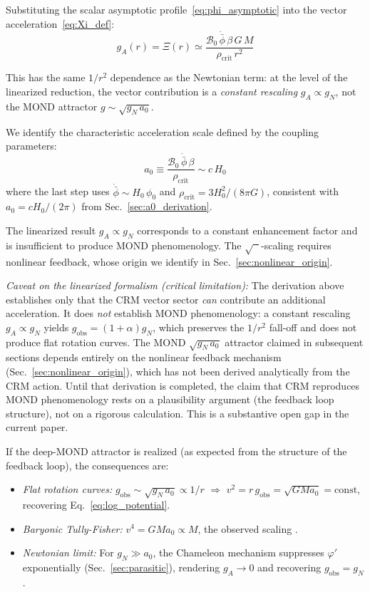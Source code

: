 \documentclass[aps,prd,twocolumn,superscriptaddress,nofootinbib]{revtex4-2}
\begin{document}
Substituting the scalar asymptotic profile~\eqref{eq:phi_asymptotic} into the vector acceleration~\eqref{eq:Xi_def}:
\begin{equation}
g_A(r) = \Xi(r) \simeq \frac{\mathcal{B}_0\,\dot{\bar{\phi}}\,\beta\,G\,M}{\rho_{\mathrm{crit}}\,r^2}
\label{eq:g_A_explicit}
\end{equation}

This has the same $1/r^2$ dependence as the Newtonian term: at the level of the linearized reduction, the vector contribution is a \textit{constant rescaling} $g_A \propto g_N$, not the MOND attractor $g \sim \sqrt{g_N\,a_0}$.

We identify the characteristic acceleration scale defined by the coupling parameters:
\begin{equation}
a_0 \equiv \frac{\mathcal{B}_0\,\dot{\bar{\phi}}\,\beta}{\rho_{\mathrm{crit}}} \sim c\,H_0
\label{eq:a0_from_eom}
\end{equation}
where the last step uses $\dot{\bar{\phi}} \sim H_0\,\phi_0$ and $\rho_{\mathrm{crit}} = 3H_0^2/(8\pi G)$, consistent with $a_0 = cH_0/(2\pi)$ from Sec.~\ref{sec:a0_derivation}.

The linearized result $g_A \propto g_N$ corresponds to a constant enhancement factor and is insufficient to produce MOND phenomenology. The $\sqrt{\phantom{x}}$-scaling requires nonlinear feedback, whose origin we identify in Sec.~\ref{sec:nonlinear_origin}.

\textit{Caveat on the linearized formalism (critical limitation):} The derivation above establishes only that the CRM vector sector \emph{can} contribute an additional acceleration. It does \emph{not} establish MOND phenomenology: a constant rescaling $g_A \propto g_N$ yields $g_\mathrm{obs} = (1+\alpha)g_N$, which preserves the $1/r^2$ fall-off and does not produce flat rotation curves. The MOND $\sqrt{g_N\,a_0}$ attractor claimed in subsequent sections depends entirely on the nonlinear feedback mechanism (Sec.~\ref{sec:nonlinear_origin}), which has not been derived analytically from the CRM action. Until that derivation is completed, the claim that CRM reproduces MOND phenomenology rests on a plausibility argument (the feedback loop structure), not on a rigorous calculation. This is a substantive open gap in the current paper.

If the deep-MOND attractor is realized (as expected from the structure of the feedback loop), the consequences are:
\begin{itemize}
\item \textit{Flat rotation curves:} $g_{\mathrm{obs}} \sim \sqrt{g_N\,a_0} \propto 1/r$ $\Rightarrow$ $v^2 = r\,g_{\mathrm{obs}} = \sqrt{GMa_0} = \mathrm{const}$, recovering Eq.~\eqref{eq:log_potential}.
\item \textit{Baryonic Tully-Fisher:} $v^4 = GMa_0 \propto M$, the observed scaling \cite{McGaugh2012}.
\item \textit{Newtonian limit:} For $g_N \gg a_0$, the Chameleon mechanism suppresses $\varphi'$ exponentially (Sec.~\ref{sec:parasitic}), rendering $g_A \to 0$ and recovering $g_{\mathrm{obs}} = g_N$.
\end{itemize}
\end{document}
